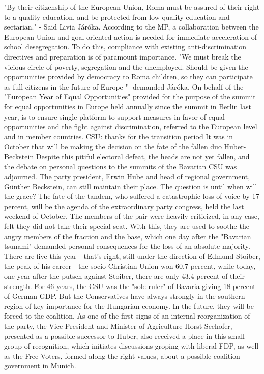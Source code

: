 "By their citizenship of the European Union, Roma must be assured of their right to a quality education, and be protected from low quality education and sectarian." - Said Livia Járóka.
According to the MP, a collaboration between the European Union and goal-oriented action is needed for immediate acceleration of school desegregation. To do this, compliance with existing anti-discrimination directives and preparation is of paramount importance.
"We must break the vicious circle of poverty, segregation and the unemployed. Should be given the opportunities provided by democracy to Roma children, so they can participate as full citizens in the future of Europe "- demanded Járóka.
On behalf of the "European Year of Equal Opportunities" provided for the purpose of the summit for equal opportunities in Europe held annually since the summit in Berlin last year, is to ensure single platform to support measures in favor of equal opportunities and the fight against discrimination, referred to the European level and in member countries.
CSU: thanks for the transition period
It was in October that will be making the decision on the fate of the fallen duo Huber-Beckstein
Despite this pitiful electoral defeat, the heads are not yet fallen, and the debate on personal questions to the summits of the Bavarian CSU was adjourned.
The party president, Erwin Hube and head of regional government, Günther Beckstein, can still maintain their place. The question is until when will the grace?
The fate of the tandem, who suffered a catastrophic loss of voice by 17 percent, will be the agenda of the extraordinary party congress, held the last weekend of October.
The members of the pair were heavily criticized, in any case, felt they did not take their special seat.
With this, they are used to soothe the angry members of the fraction and the base, which one day after the "Bavarian tsunami" demanded personal consequences for the loss of an absolute majority.
There are five this year - that's right, still under the direction of Edmund Stoiber, the peak of his career - the socio-Christian Union won 60.7 percent, while today, one year after the putsch against Stoiber, there are only 43.4 percent of their strength.
For 46 years, the CSU was the "sole ruler" of Bavaria giving 18 percent of German GDP.
But the Conservatives have always strongly in the southern region of key importance for the Hungarian economy. In the future, they will be forced to the coalition.
As one of the first signs of an internal reorganization of the party, the Vice President and Minister of Agriculture Horst Seehofer, presented as a possible successor to Huber, also received a place in this small group of recognition, which initiates discussions groping with liberal FDP, as well as the Free Voters, formed along the right values, about a possible coalition government in Munich.
